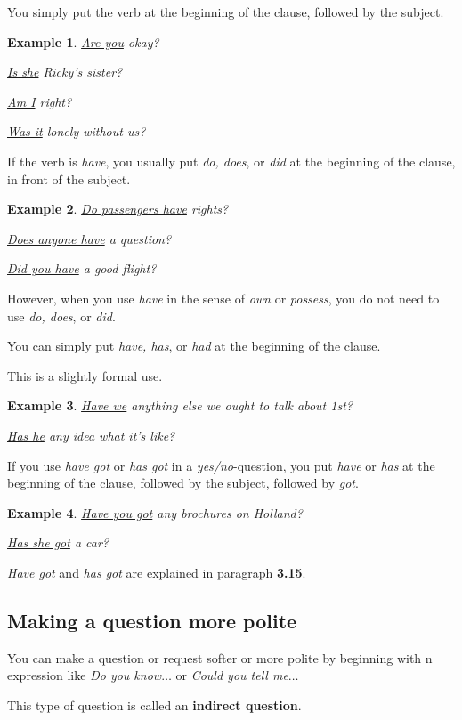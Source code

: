 \documentclass[oneside]{book}
\numberwithin{equation}{section}
\newtheorem{example}{Example}[section]
\begin{document}
You simply put the verb at the beginning of the clause, followed by the subject.
\begin{example}
    \underline{Are you} okay?
    
    \underline{Is she} Ricky's sister?
    
    \underline{Am I} right?
    
    \underline{Was it} lonely without us?
\end{example}
If the verb is \textit{have}, you usually put \textit{do, does}, or \textit{did} at the beginning of the clause, in front of the subject.
\begin{example}
    \underline{Do passengers have} rights?
    
    \underline{Does anyone have} a question?
    
    \underline{Did you have} a good flight?
\end{example}
However, when you use \textit{have} in the sense of \textit{own} or \textit{possess}, you do not need to use \textit{do, does}, or \textit{did}.

You can simply put \textit{have, has}, or \textit{had} at the beginning of the clause.

This is a slightly formal use.
\begin{example}
    \underline{Have we} anything else we ought to talk about 1st?
    
    \underline{Has he} any idea what it's like?
\end{example}
If you use \textit{have got} or \textit{has got} in a \textit{yes/no}-question, you put \textit{have} or \textit{has} at the beginning of the clause, followed by the subject, followed by \textit{got}.
\begin{example}
    \underline{Have you got} any brochures on Holland?
    
    \underline{Has she got} a car?
\end{example}
\textit{Have got} and \textit{has got} are explained in paragraph \textbf{3.15}.

\subsection{Making a question more polite}
\noindent{} You can make a question or request softer or more polite by beginning with n expression like \textit{Do you know$\ldots$} or \textit{Could you tell me$\ldots$}

This type of question is called an \textbf{indirect question}.
\end{document}
